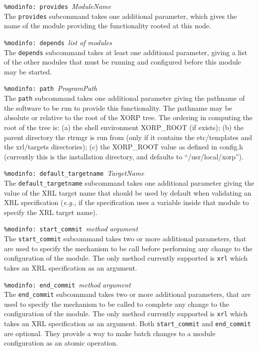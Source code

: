 \documentclass[11pt]{article}
\newcommand{\eg}{\emph{e.g.,}\xspace}
\begin{document}
\begin{description}

\item {{\tt \%modinfo: provides }{\it ModuleName}}  \\
The {\tt provides} subcommand takes one additional parameter, which gives the
name of the module providing the functionality rooted at this node.

\item {{\tt \%modinfo: depends }{\it list of modules}}  \\
The {\tt depends} subcommand takes at least one additional
parameter, giving a list of the other modules that must
be running and configured before this module may be started.

\item {{\tt \%modinfo: path }{\it ProgramPath}}  \\
The {\tt path} subcommand takes one additional parameter giving the pathname
of the software to be run
to provide this functionality.  The pathname may be absolute or
relative to the root of the XORP tree. The ordering in computing the root of
the tree is: (a) the shell environment XORP\_ROOT (if exists); (b) the parent
directory the rtrmgr is run from (only if it contains the
etc/templates and the xrl/targets directories); (c) the XORP\_ROOT value as
defined in config.h (currently this is the installation directory, and
defaults to ``/usr/local/xorp'').

\item {{\tt \%modinfo: default\_targetname }{\it TargetName}}  \\
The {\tt default\_targetname} subcommand takes one additional parameter giving
the value of the XRL target name that should be used by default when
validating an XRL specification (\eg if the specification uses a variable
inside that module to specify the XRL target name).

\item {{\tt \%modinfo: start\_commit }{\it method }{\it argument}}  \\
The {\tt start\_commit} subcommand takes two or more additional parameters,
that
are used to specify the mechanism to be call before performing any change to
the configuration of the module. The only method currently supported is
{\tt xrl} which takes an XRL specification as an argument.

\item {{\tt \%modinfo: end\_commit }{\it method }{\it argument}}  \\
The {\tt end\_commit} subcommand takes two or more additional parameters, that
are used to specify the mechanism to be called to complete any change to the
configuration of the module. The only method currently supported is {\tt xrl}
which takes an XRL specification as an argument.
Both {\tt start\_commit} and {\tt end\_commit} are optional. They provide a way
to make batch changes to a module configuration as an atomic operation.


\end{description}
\end{document}
